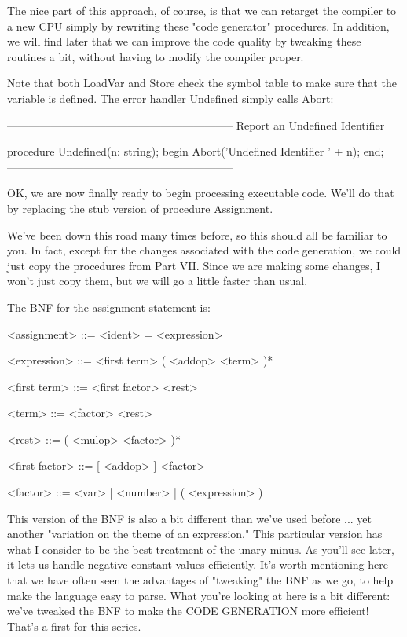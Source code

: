 \documentclass[float=false, crop=false]{standalone}
\begin{document}
The nice part of this approach, of course, is that we can retarget the compiler
to a new CPU simply by rewriting these "code generator" procedures. In addition,
we will find later that we can improve the code quality by tweaking these
routines a bit, without having to modify the compiler proper.

Note that both LoadVar  and Store check the symbol table to make sure that the
variable is defined.  The  error  handler Undefined
simply calls Abort:

\begin{code}
{--------------------------------------------------------------}
{ Report an Undefined Identifier }

procedure Undefined(n: string);
begin
   Abort('Undefined Identifier ' + n);
end;
{--------------------------------------------------------------}
\end{code}

OK, we are now finally ready to begin processing executable code. We'll do that
by replacing the stub version of procedure Assignment.

We've been down this road many times before, so this should all be familiar to
you. In fact, except for the changes associated with the code generation, we
could just copy the procedures from Part VII. Since we are making some changes,
I won't just copy them, but we will go a little faster than usual.

The BNF for the assignment statement is:

     <assignment> ::= <ident> = <expression>

     <expression> ::= <first term> ( <addop> <term> )*

     <first term> ::= <first factor> <rest>

     <term> ::= <factor> <rest>

     <rest> ::= ( <mulop> <factor> )*

     <first factor> ::= [ <addop> ] <factor>

     <factor> ::= <var> | <number> | ( <expression> )


This version of the BNF is also a bit different than we've used before ... yet
another "variation on the theme of an expression." This particular version has
what I consider to be the best treatment of the unary minus. As you'll see
later, it lets us handle negative constant values efficiently. It's worth
mentioning here that we have often seen the advantages of "tweaking" the BNF as
we go, to help make the language easy to parse. What you're looking at here is a
bit different: we've tweaked the BNF to make the CODE GENERATION more efficient!
That's a first for this series.
\end{document}
